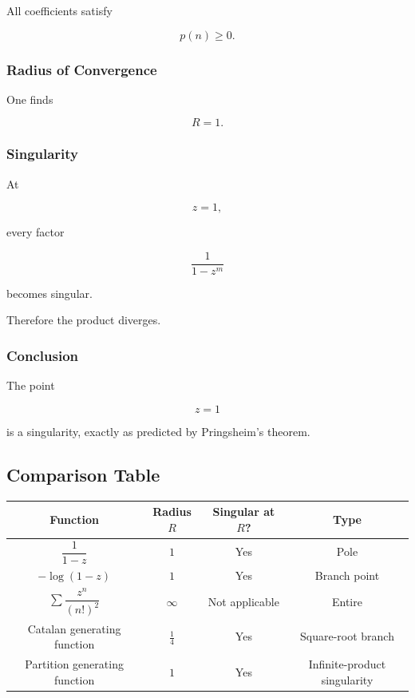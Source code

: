 \documentclass[12pt,a4paper]{article}
\theoremstyle{notespace}
\begin{document}
All coefficients satisfy

\[
p(n)\ge0.
\]

\subsubsection*{Radius of Convergence}

One finds

\[
R=1.
\]

\subsubsection*{Singularity}

At

\[
z=1,
\]

every factor

\[
\frac1{1-z^m}
\]

becomes singular.

Therefore the product diverges.

\subsubsection*{Conclusion}

The point

\[
z=1
\]

is a singularity, exactly as predicted by Pringsheim's theorem.

\bigskip

\subsection{Comparison Table}

\begin{center}
	\renewcommand{\arraystretch}{1.4}
	\begin{tabular}{|c|c|c|c|}
		\hline
		Function & Radius \(R\) & Singular at \(R\)? & Type \\
		\hline
		\(\dfrac1{1-z}\) & \(1\) & Yes & Pole \\
		\hline
		\(-\log(1-z)\) & \(1\) & Yes & Branch point \\
		\hline
		\(\sum \dfrac{z^n}{(n!)^2}\) & \(\infty\) & Not applicable & Entire \\
		\hline
		Catalan generating function & \(\frac14\) & Yes & Square-root branch \\
		\hline
		Partition generating function & \(1\) & Yes & Infinite-product singularity \\
		\hline
	\end{tabular}
\end{center}
\end{document}
